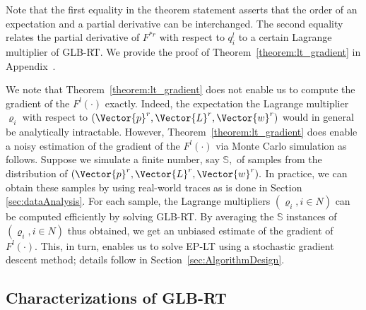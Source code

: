 Note that the first equality in the theorem statement asserts that the
order of an expectation and a partial derivative can be
interchanged. The second equality relates the partial derivative of
$F^{*r}$ with respect to $q^l_i$ to a certain Lagrange multiplier of
GLB-RT. We provide the proof of Theorem~\ref{theorem:lt_gradient} in
Appendix~.

We note that Theorem~\ref{theorem:lt_gradient} does not enable us to
compute the gradient of the $F^l(\cdot)$ exactly. Indeed, the
expectation the Lagrange multiplier $\varrho_i$ with respect to
$(\Vector{p}^r,\Vector{L}^r,\Vector{w}^r)$ would in general be
analytically intractable. However, Theorem~\ref{theorem:lt_gradient}
does enable a noisy estimation of the gradient of the $F^l(\cdot)$ via
Monte Carlo simulation as follows. Suppose we simulate a finite
number, say $\mathbb{S},$ of samples from the distribution of
$(\Vector{p}^r,\Vector{L}^r,\Vector{w}^r).$ In practice, we can obtain
these samples by using real-world traces as is done in Section
\ref{sec:dataAnalysis}. For each sample, the Lagrange multipliers
$(\varrho_i, i \in N)$ can be computed efficiently by solving
GLB-RT. By averaging the $\mathbb{S}$ instances of $(\varrho_i, i \in
N)$ thus obtained, we get an unbiased estimate of the gradient of
$F^l(\cdot).$ This, in turn, enables us to solve EP-LT using a
stochastic gradient descent method; details follow in
Section~\ref{sec:AlgorithmDesign}.


\subsection{Characterizations of GLB-RT}
\label{sec:char_glb-rt}


